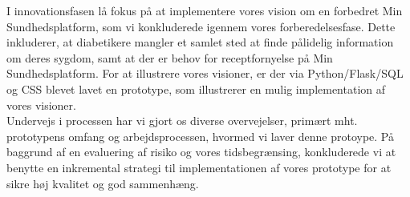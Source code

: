 I innovationsfasen lå fokus på at implementere vores vision om en forbedret Min Sundhedsplatform, som vi konkluderede igennem vores forberedelsesfase. Dette inkluderer, at diabetikere mangler et samlet sted at finde pålidelig information om deres sygdom, samt at der er behov for receptfornyelse på Min Sundhedsplatform. For at illustrere vores visioner, er der via Python/Flask/SQL og CSS blevet lavet en prototype, som illustrerer en mulig implementation af vores visioner.\\
Undervejs i processen har vi gjort os diverse overvejelser, primært mht. prototypens omfang og arbejdsprocessen, hvormed vi laver denne protoype. På baggrund af en evaluering af risiko og vores tidsbegrænsing, konkluderede vi at benytte en inkremental strategi til implementationen af vores prototype for at sikre høj kvalitet og god sammenhæng. 
